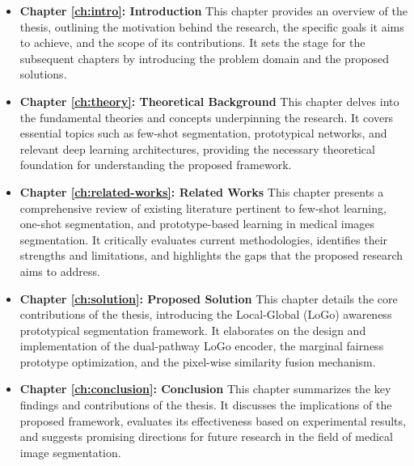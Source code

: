 \begin{itemize}
    \item \textbf{Chapter \ref{ch:intro}: Introduction} This chapter provides an overview of the thesis, outlining the motivation behind the research, the specific goals it aims to achieve, and the scope of its contributions. It sets the stage for the subsequent chapters by introducing the problem domain and the proposed solutions.

    \item \textbf{Chapter \ref{ch:theory}: Theoretical Background} This chapter delves into the fundamental theories and concepts underpinning the research. It covers essential topics such as few-shot segmentation, prototypical networks, and relevant deep learning architectures, providing the necessary theoretical foundation for understanding the proposed framework.

    \item \textbf{Chapter \ref{ch:related-works}: Related Works} This chapter presents a comprehensive review of existing literature pertinent to few-shot learning, one-shot segmentation, and prototype-based learning in medical images segmentation. It critically evaluates current methodologies, identifies their strengths and limitations, and highlights the gaps that the proposed research aims to address.

    \item \textbf{Chapter \ref{ch:solution}: Proposed Solution} This chapter details the core contributions of the thesis, introducing the Local-Global (LoGo) awareness prototypical segmentation framework. It elaborates on the design and implementation of the dual-pathway LoGo encoder, the marginal fairness prototype optimization, and the pixel-wise similarity fusion mechanism.

    \item \textbf{Chapter \ref{ch:conclusion}: Conclusion} This chapter summarizes the key findings and contributions of the thesis. It discusses the implications of the proposed framework, evaluates its effectiveness based on experimental results, and suggests promising directions for future research in the field of medical image segmentation.
\end{itemize}